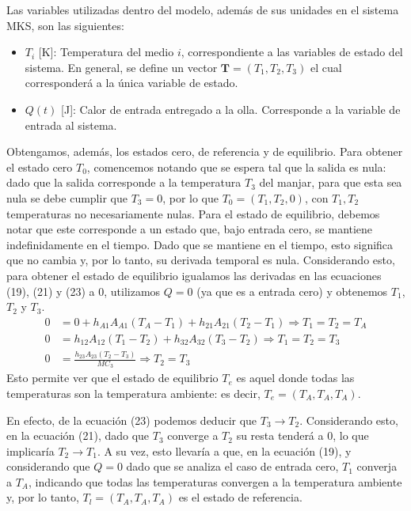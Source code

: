 \documentclass[
  11pt,
  letterpaper,
   addpoints,
   answers
  ]{exam}
\begin{document}
\begin{questions}
\begin{solution}
Las variables utilizadas dentro del modelo, además de sus unidades en el sistema MKS, son las siguientes:

\begin{itemize}
    \item $T_i$ [K]: Temperatura del medio $i$, correspondiente a las variables de estado del sistema. En general, se define un vector $\mathbf{T} = (T_1, T_2, T_3)$ el cual corresponderá a la única variable de estado.
    \item $Q(t)$ [J]: Calor de entrada entregado a la olla. Corresponde a la variable de entrada al sistema.
\end{itemize}

Obtengamos, además, los estados cero, de referencia y de equilibrio. Para obtener el estado cero $T_0$, comencemos notando que se espera tal que la salida es nula: dado que la salida corresponde a la temperatura $T_3$ del manjar, para que esta sea nula se debe cumplir que $T_3 = 0$, por lo que $T_0 = (T_1, T_2, 0)$, con $T_1, T_2$ temperaturas no necesariamente nulas.
Para el estado de equilibrio, debemos notar que este corresponde a un estado que, bajo entrada cero, se mantiene indefinidamente en el tiempo. Dado que se mantiene en el tiempo, esto significa que no cambia y, por lo tanto, su derivada temporal es nula. Considerando esto, para obtener el estado de equilibrio igualamos las derivadas en las ecuaciones (19), (21) y (23) a 0, utilizamos $Q = 0$ (ya que es a entrada cero) y obtenemos $T_1$, $T_2$ y $T_3$.
\begin{align}
    0 &= 0 + h_{A1}A_{A1} (T_A - T_1) + h_{21}A_{21} (T_2 - T_1) \Rightarrow T_1 = T_2 = T_A \tag{24} \\
    0 &= h_{12}A_{12} (T_1 - T_2) + h_{32}A_{32} (T_3 - T_2) \Rightarrow T_1 = T_2 = T_3 \tag{25} \\
    0 &= \frac{h_{23}A_{23} (T_2 - T_3)}{MC_3} \Rightarrow T_2 = T_3 \tag{26}
\end{align}
Esto permite ver que el estado de equilibrio $T_e$ es aquel donde todas las temperaturas son la temperatura ambiente: es decir, $T_e = (T_A, T_A, T_A)$.

En efecto, de la ecuación (23) podemos deducir que $T_3 \rightarrow T_2$. Considerando esto, en la ecuación (21), dado que $T_3$ converge a $T_2$ su resta tenderá a 0, lo que implicaría $T_2 \rightarrow T_1$. A su vez, esto llevaría a que, en la ecuación (19), y considerando que $Q = 0$ dado que se analiza el caso de entrada cero, $T_1$ converja a $T_A$, indicando que todas las temperaturas convergen a la temperatura ambiente y, por lo tanto, $T_l = (T_A, T_A, T_A)$ es el estado de referencia.


\end{solution}
\end{questions}
\end{document}
